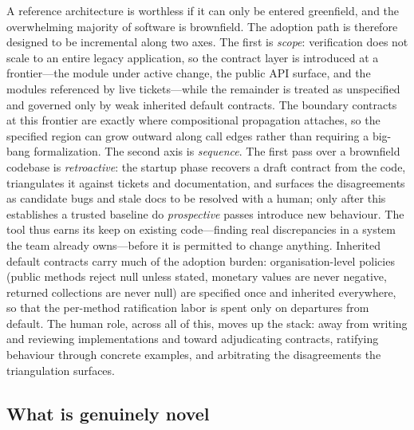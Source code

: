 A reference architecture is worthless if it can only be entered greenfield, and
the overwhelming majority of software is brownfield. The adoption path is
therefore designed to be incremental along two axes. The first is
\emph{scope}: verification does not scale to an entire legacy application, so the
contract layer is introduced at a frontier---the module under active change, the
public API surface, and the modules referenced by live tickets---while the
remainder is treated as unspecified and governed only by weak inherited default
contracts. The boundary contracts at this frontier are exactly where
compositional propagation attaches, so the specified region can grow outward
along call edges rather than requiring a big-bang formalization. The second axis
is \emph{sequence}. The first pass over a brownfield codebase is
\emph{retroactive}: the startup phase recovers a draft contract from the code,
triangulates it against tickets and documentation, and surfaces the
disagreements as candidate bugs and stale docs to be resolved with a human;
only after this establishes a trusted baseline do \emph{prospective} passes
introduce new behaviour. The tool thus earns its keep on existing code---finding
real discrepancies in a system the team already owns---before it is permitted to
change anything. Inherited default contracts carry much of the adoption burden:
organisation-level policies (public methods reject null unless stated, monetary
values are never negative, returned collections are never null) are specified
once and inherited everywhere, so that the per-method ratification labor is
spent only on departures from default. The human role, across all of this, moves
up the stack: away from writing and reviewing implementations and toward
adjudicating contracts, ratifying behaviour through concrete examples, and
arbitrating the disagreements the triangulation surfaces.

\subsection{What is genuinely novel}\label{subsec:disc-novelty}


